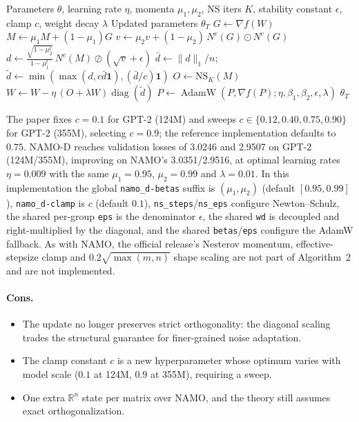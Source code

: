 \begin{algorithm}[H]
\caption{NAMO-D (Diagonal Extension of NAMO)}
\label{alg:namo-d}
\begin{algorithmic}[1]
\Require Parameters $\theta$, learning rate $\eta$, momenta $\mu_1,\mu_2$, NS iters $K$, stability constant $\epsilon$, clamp $c$, weight decay $\lambda$
\Ensure Updated parameters $\theta_T$
        \State $G \gets \nabla f(W)$ 
        \State $M \gets \mu_1 M + (1-\mu_1) G$ 
        \State $v \gets \mu_2 v + (1-\mu_2)\,N^c(G)\odot N^c(G)$ 
        \State $d \gets \frac{\sqrt{1-\mu_2^t}}{1-\mu_1^t}\,N^c(M) \oslash (\sqrt{v}+\epsilon)$ 
        \State $\bar d \gets \lVert d\rVert_1/n$; \quad
               $\tilde d \gets \min(\max(d, c\bar d\mathbf 1), (\bar d/c)\mathbf 1)$ 
        \State $O \gets \mathrm{NS}_K(M)$ 
        \State $W \gets W - \eta\,(O + \lambda W)\operatorname{diag}(\tilde d)$ 
    \Else
        \State $P \gets \operatorname{AdamW}(P, \nabla f(P); \eta, \beta_1, \beta_2, \epsilon, \lambda)$ 
    \EndIf
\EndFor
\Return $\theta_T$
\end{algorithmic}
\end{algorithm}

The paper fixes $c=0.1$ for GPT-2 (124M) and sweeps $c\in\{0.12,0.40,0.75,0.90\}$ for
GPT-2 (355M), selecting $c=0.9$; the reference implementation defaults to $0.75$.
NAMO-D reaches validation losses of 3.0246 and 2.9507 on GPT-2 (124M/355M), improving on
NAMO's 3.0351/2.9516, at optimal learning rates $\eta=0.009$ with the same
$\mu_1=0.95$, $\mu_2=0.99$ and $\lambda=0.01$. In this implementation the global
\texttt{namo\_d-betas} suffix is $(\mu_1,\mu_2)$ (default $[0.95,0.99]$),
\texttt{namo\_d-clamp} is $c$ (default $0.1$), \texttt{ns\_steps}/\texttt{ns\_eps}
configure Newton--Schulz, the shared per-group \texttt{eps} is the denominator
$\epsilon$, the shared \texttt{wd} is decoupled and right-multiplied by the diagonal,
and the shared \texttt{betas}/\texttt{eps} configure the AdamW fallback. As with NAMO,
the official release's Nesterov momentum, effective-stepsize clamp and
$0.2\sqrt{\max(m,n)}$ shape scaling are not part of Algorithm~2 and are not implemented.

\paragraph{Cons.}
\begin{itemize}[leftmargin=*]
\item The update no longer preserves strict orthogonality: the diagonal scaling trades
  the structural guarantee for finer-grained noise adaptation.
\item The clamp constant $c$ is a new hyperparameter whose optimum varies with model
  scale ($0.1$ at 124M, $0.9$ at 355M), requiring a sweep.
\item One extra $\mathbb{R}^n$ state per matrix over NAMO, and the theory still assumes
  exact orthogonalization.
\end{itemize}

